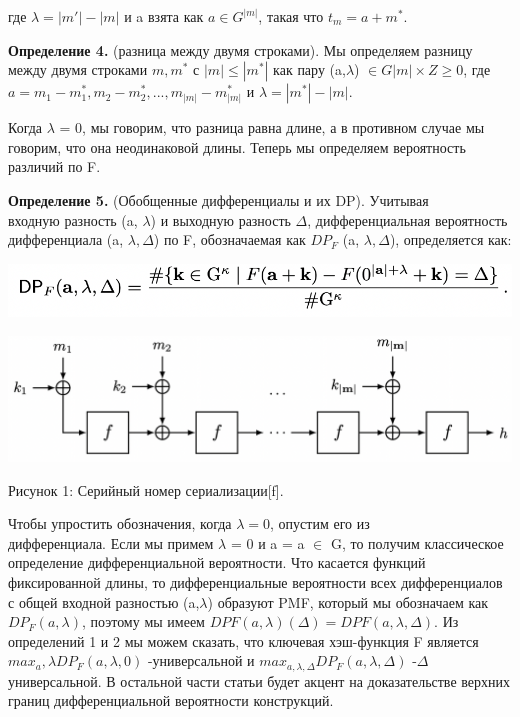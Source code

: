 \documentclass[utf8,14pt,a4paper,oneside,russian]{book}
\begin{document}
где $\lambda=|m'|-|m|$ и a взята как $a\in G^{|m|}$, такая что $t_m=a+m^*$.

\textbf{Определение 4.} (разница между двумя строками). Мы определяем разницу между
двумя строками $m,m^*$ с $|m| \le |m^*|$ как пару (a,$\lambda$) $\in G|m| ×Z \ge 0$, где 
$a = m_1 - m^*_1, m_2 - m^*_2,...,m_{|m|} - m^*_{|m|}$ и $\lambda =|m^*| - |m|$.

Когда $\lambda$ = 0, мы говорим, что разница равна длине, а в противном 
случае мы говорим, что она неодинаковой длины. Теперь мы определяем 
вероятность различий по F.

\textbf{Определение 5.} (Обобщенные дифференциалы и их DP). Учитывая \\
входную разность (a, $\lambda$) и выходную разность $\Delta$, дифференциальная вероятность 
дифференциала (a, $\lambda, \Delta$) по F, обозначаемая как $DP_F$ (a, $\lambda, \Delta$),
 определяется как:

 \includegraphics[width=13.5cm]{form7}

 \includegraphics[width=13.5cm]{form8}

\begin{center}
  Рисунок 1: Серийный номер сериализации[f].
\end{center}

Чтобы упростить обозначения, когда $\lambda = 0$, опустим его из \\
дифференциала. Если мы примем $\lambda$ = 0 и a = a $\in$ G, то получим 
классическое определение дифференциальной вероятности.
Что касается функций фиксированной длины, то дифференциальные 
вероятности всех дифференциалов с общей входной разностью (a,$\lambda$) 
образуют PMF, который мы обозначаем как $DP_F(a,\lambda)$, поэтому мы 
имеем $DPF (a,\lambda)(\Delta) = DPF (a, \lambda, \Delta)$. 
Из определений 1 и 2 мы можем сказать, что ключевая хэш-функция F 
является $max_a, \lambda DP_F (a, \lambda, 0)$ -универсальной и 
$max_{a, \lambda, \Delta} DP_F (a, \lambda, \Delta)$ -$\Delta$универсальной. 
В остальной части статьи будет акцент на доказательстве верхних границ 
дифференциальной вероятности конструкций.
\end{document}
